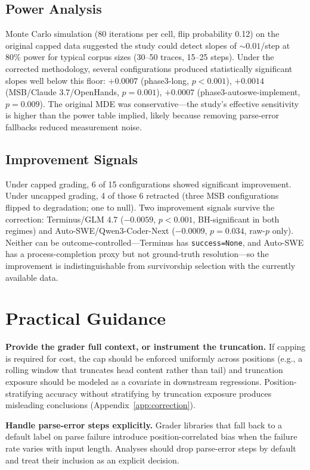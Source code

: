 \documentclass[11pt]{article}
\begin{document}
\subsection{Power Analysis}

Monte Carlo simulation (80 iterations per cell, flip probability 0.12) on the original capped data suggested the study could detect slopes of ${\sim}0.01$/step at 80\% power for typical corpus sizes (30--50 traces, 15--25 steps).
Under the corrected methodology, several configurations produced statistically significant slopes well below this floor: $+0.0007$ (phase3-long, $p < 0.001$), $+0.0014$ (MSB/Claude 3.7/OpenHands, $p = 0.001$), $+0.0007$ (phase3-autoswe-implement, $p = 0.009$).
The original MDE was conservative---the study's effective sensitivity is higher than the power table implied, likely because removing parse-error fallbacks reduced measurement noise.

\subsection{Improvement Signals}

Under capped grading, 6 of 15 configurations showed significant improvement.
Under uncapped grading, 4 of those 6 retracted (three MSB configurations flipped to degradation; one to null).
Two improvement signals survive the correction: Terminus/GLM 4.7 ($-0.0059$, $p < 0.001$, BH-significant in both regimes) and Auto-SWE/Qwen3-Coder-Next ($-0.0009$, $p = 0.034$, raw-$p$ only).
Neither can be outcome-controlled---Terminus has \texttt{success=None}, and Auto-SWE has a process-completion proxy but not ground-truth resolution---so the improvement is indistinguishable from survivorship selection with the currently available data.

\section{Practical Guidance}

\textbf{Provide the grader full context, or instrument the truncation.}
If capping is required for cost, the cap should be enforced uniformly across positions (e.g., a rolling window that truncates head content rather than tail) and truncation exposure should be modeled as a covariate in downstream regressions.
Position-stratifying accuracy without stratifying by truncation exposure produces misleading conclusions (Appendix~\ref{app:correction}).

\textbf{Handle parse-error steps explicitly.}
Grader libraries that fall back to a default label on parse failure introduce position-correlated bias when the failure rate varies with input length.
Analyses should drop parse-error steps by default and treat their inclusion as an explicit decision.
\end{document}
